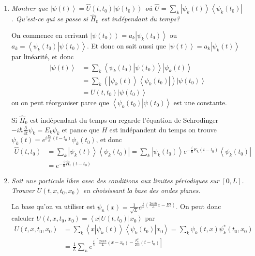 \documentclass[10pt]{report}
\newcommand{\bra}[1]{\left<#1\right|}
\newcommand{\ket}[1]{\left|#1\right>}
\newcommand{\dotp}[2]{\left<#1\left.\right|#2\right>}
\newcommand{\pd}[2]{\frac{\partial #1}{\partial#2}}
\begin{document}
\begin{enumerate}[1)]
    \item \emph{Montrer que $\ket{\psi(t)} = \hat{U}(t,t_0) \ket{\psi(t_0)}$ o\`u $\hat{U} = \sum\limits_{k}^{}\ket{\psi_k(t)}\bra{\psi_k(t_0)}$. Qu'est-ce qui se passe si $\hat{H}_0$ est ind\'ependant du temps?}

        On commence en ecrivant $\ket{\psi(t_0)} = a_k\ket{\psi_k(t_0)}$ ou $a_k = \dotp{\psi_k(t_0)}{\psi(t_0)}$. Et donc on sait aussi que $\ket{\psi(t)} = a_k\ket{\psi_k(t)}$ par lin\'earit\'e, et donc
        \begin{align}
            \ket{\psi(t)} &= \sum\limits_{k}^{}\dotp{\psi_k(t_0)}{\psi(t_0)}\ket{\psi_k(t)}\\
            &= \sum\limits_{k}^{}(\ket{\psi_k(t)}\bra{\psi_k(t_0)})\ket{\psi(t_0)}\\
            &= U(t,t_0)\ket{\psi(t_0)}
        \end{align}
        ou on peut r\'eorganiser parce que $\dotp{\psi_k(t_0)}{\psi(t_0)}$ est une constante.

        Si $\hat{H}_0$ est ind\'ependant du temps on regarde l'\'equation de Schrodinger $-i\hbar \pd{}{t}\psi_k = E_k\psi_k$ et pance que $H$ est ind\'epandent du temps on trouve $\psi_k(t) = e^{i\frac{E_k}{\hbar}(t-t_0)}\psi_k(t_0)$, et donc
        \begin{align}
            \hat{U}(t,t_0) &= \sum\limits_{k}^{}\ket{\psi_k(t)}\bra{\psi_k(t_0)} = \sum\limits_{k}^{}\ket{\psi_k(t_0)}e^{-\frac{i}{\hbar}E_k(t-t_0)}\bra{\psi_k(t_0)}\\
            &= e^{-\frac{i}{\hbar}\hat{H}_0(t-t_0)}
        \end{align}
    \item \emph{Soit une particule libre avec des conditions aux limites p\'eriodiques sur $\left[ 0,L \right]$. Trouver $U(t,x,t_0,x_0)$ en choisissant la base des ondes planes.}

        La base qu'on va utiliser est $\psi_n(x) = \frac{1}{\sqrt{L}}e^{\frac{i}{\hbar}\left( \frac{2n\pi \hbar}{L}x - Et \right)}$. On peut donc calculer $U(t,x,t_0,x_0) = \bra{x}U(t,t_0) \ket{x_0}$ par
        \begin{align}
            U(t,x,t_0,x_0) &= \sum\limits_{k}^{}\dotp{x}{\psi_k(t)}\dotp{\psi_k(t_0)}{x_0} = \sum\limits_{k}^{}\psi_k(t,x)\psi_k^*(t_0,x_0)\\
            &= \frac{1}{L}\sum\limits_{n}^{}e^{\frac{i}{\hbar}\left[ \frac{2n\pi\hbar}{L}\left( x-x_0 \right) - \frac{p_n^2}{2m}(t-t_0) \right]}
        \end{align}


\end{enumerate}
\end{document}
